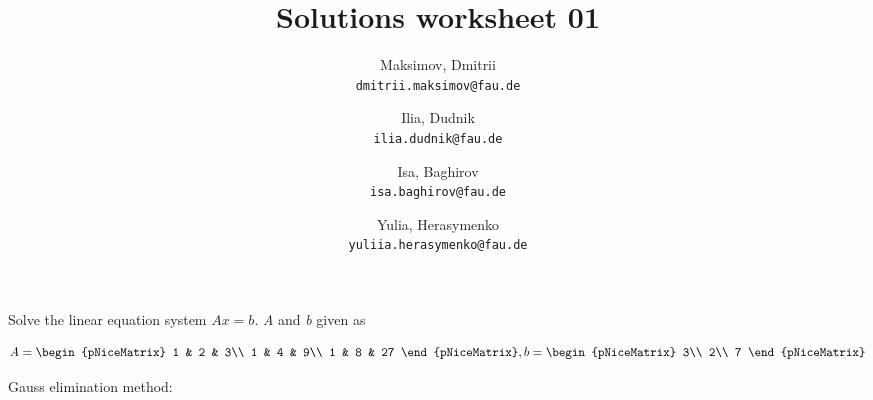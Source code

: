 \documentclass{homework}
\title{Solutions worksheet 01}
\author{
  Maksimov, Dmitrii\\
  \texttt{dmitrii.maksimov@fau.de}
  \and
  Ilia, Dudnik\\
  \texttt{ilia.dudnik@fau.de}
  \and
  Isa, Baghirov\\
  \texttt{isa.baghirov@fau.de}
  \and
  Yulia, Herasymenko\\
  \texttt{yuliia.herasymenko@fau.de}
}
\begin{document}
\maketitle

Solve the linear equation system $Ax=b$. \emph{A} and \emph{b} given as

$$
A = \begin{pNiceMatrix}
1 & 2 & 3\\
1 & 4 & 9\\
1 & 8 & 27
\end{pNiceMatrix}
, b= \begin{pNiceMatrix}
3\\
2\\
7
\end{pNiceMatrix}
$$

Gauss elimination method:
\end{document}
